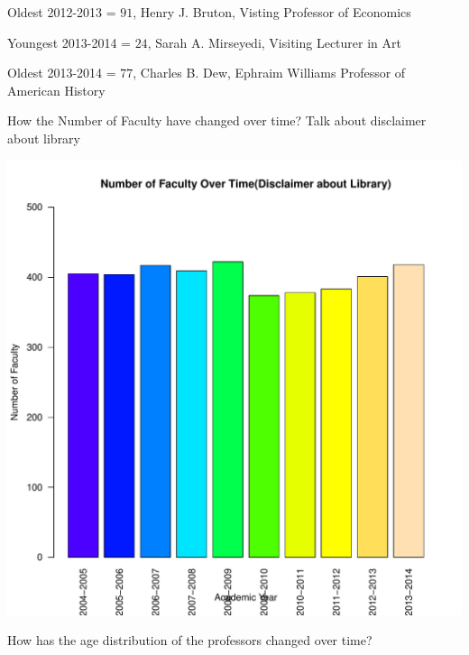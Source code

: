 \documentclass[12pt,a4paper]{article}\usepackage[]{graphicx}\usepackage[]{color}
\makeatletter
\def\maxwidth{ %
  \ifdim\Gin@nat@width>\linewidth
    \linewidth
  \else
    \Gin@nat@width
  \fi
}
\newenvironment{knitrout}{}{} %
\theoremstyle{definition}
\makeatother
\begin{document}
\bigskip\noindent
Oldest 2012-2013 = \(91\), Henry J. Bruton, Visting Professor of Economics

\bigskip\noindent
Youngest 2013-2014 = \(24\), Sarah A. Mirseyedi, Visiting Lecturer in Art

\bigskip\noindent
Oldest 2013-2014 = \(77\), Charles B. Dew, Ephraim Williams Professor of American History

\bigskip\noindent
How the Number of Faculty have changed over time? Talk about disclaimer about library



\begin{knitrout}
\color{fgcolor}
\includegraphics[width=\maxwidth]{figure/unnamed-chunk-8-1} 

\end{knitrout}

\bigskip\noindent
How has the age distribution of the professors changed over time?
\end{document}
